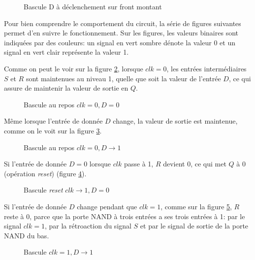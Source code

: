 \documentclass[11pt]{article}
\begin{document}
\begin{figure}[htbp]
\centering

\caption{\label{fig:orge8ca712}Bascule D à déclenchement sur front montant}
\end{figure}

Pour bien comprendre le comportement du circuit, la série de figures
suivantes permet d'en suivre le fonctionnement. Sur les figures,
les valeurs binaires sont indiquées par des couleurs: un signal en
vert sombre dénote la valeur 0 et un signal en vert clair représente
la valeur 1.

Comme on peut le voir sur la figure \ref{fig:org73073f7}, lorsque \(clk = 0\), les
entrées intermédiaires \(S\) et \(R\) sont maintenues au niveau 1,
quelle que soit la valeur de l'entrée \(D\), ce qui assure de
maintenir la valeur de sortie en \(Q\).

\begin{figure}[htbp]
\centering

\caption{\label{fig:org73073f7}Bascule au repos  \(clk = 0, D=0\)}
\end{figure}

Même lorsque l'entrée de donnée \(D\) change, la valeur de sortie est
maintenue, comme on le voit sur la figure \ref{fig:org2c031ad}.

\begin{figure}[htbp]
\centering

\caption{\label{fig:org2c031ad}Bascule au repos  \(clk = 0, D \rightarrow 1\)}
\end{figure}

Si l'entrée de donnée \(D = 0\) lorsque \(clk\) passe à 1, \(R\)
devient 0, ce qui met \(Q\) à 0 (opération \emph{reset}) (figure
\ref{fig:org6d04566}).

\begin{figure}[htbp]
\centering

\caption{\label{fig:org6d04566}Bascule  \emph{reset} \(clk \rightarrow 1, D=0\)}
\end{figure}

Si l'entrée de donnée \(D\) change pendant que \(clk = 1\), comme sur
la figure \ref{fig:org9fcff18}, \(R\) reste à 0, parce que la porte NAND à
trois entrées a ses trois entrées à 1: par le signal \(clk = 1\), par
la rétroaction du signal \(S\) et par le signal de sortie de la porte
NAND du bas.

\begin{figure}[htbp]
\centering

\caption{\label{fig:org9fcff18}Bascule   \(clk = 1, D \rightarrow 1\)}
\end{figure}
\end{document}
